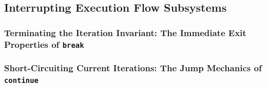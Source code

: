 \subsection{Interrupting Execution Flow Subsystems}
\subsubsection{Terminating the Iteration Invariant: The Immediate Exit Properties of \texttt{break}}
\subsubsection{Short-Circuiting Current Iterations: The Jump Mechanics of \texttt{continue}}
